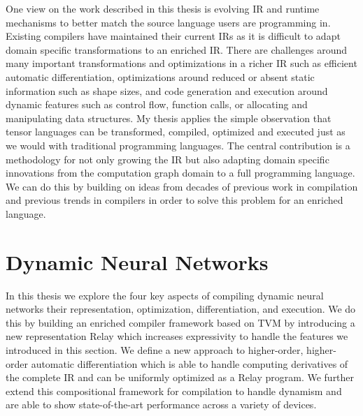 One view on the work described in this thesis is evolving IR and runtime mechanisms to better
  match the source language users are programming in.
Existing compilers have maintained their current IRs as it is difficult
  to adapt domain specific transformations to an enriched IR.
There are challenges around many important transformations and optimizations
  in a richer IR such as efficient automatic differentiation, optimizations around
  reduced or absent static information such as shape sizes, and code generation
  and execution around dynamic features such as control flow, function calls,
  or allocating and manipulating data structures.
My thesis applies the simple observation that tensor languages can be transformed, compiled,
  optimized and executed just as we would with traditional programming languages.
The central contribution is a methodology for not only growing the IR but also
  adapting domain specific innovations from the computation graph domain to
  a full programming language.
We can do this by building on ideas from decades of previous work in compilation and previous
    trends in compilers in order to solve this problem for an enriched language.

\section{Dynamic Neural Networks}

In this thesis we explore the four key aspects of compiling dynamic
  neural networks their representation, optimization, differentiation,
  and execution.
We do this by building an enriched compiler framework based on TVM by introducing
  a new representation Relay which increases expressivity to handle the features
  we introduced in this section.
We define a new approach to higher-order, higher-order automatic differentiation
  which is able to handle computing derivatives of the complete IR and
  can be uniformly optimized as a Relay program.
We further extend this compositional framework for compilation to handle dynamism
  and are able to show state-of-the-art performance across a variety of devices.


